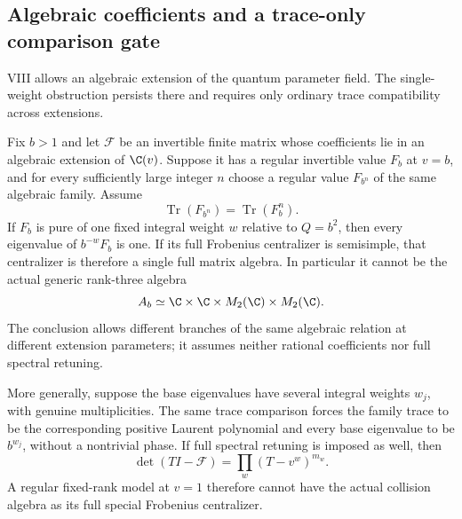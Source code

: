 \subsection{Algebraic coefficients and a trace-only comparison gate}
VIII allows an algebraic extension of the quantum parameter field.
The single-weight obstruction persists there and requires only
ordinary trace compatibility across extensions.

\begin{finding}\label{f:algebraictrace}
Fix $b>1$ and let $\mathcal F$ be an invertible finite matrix
whose coefficients lie in an algebraic extension of $\C(v)$.
Suppose it has a regular invertible value $F_b$ at $v=b$,
and for every sufficiently large integer $n$ choose a regular
value $F_{b^n}$ of the same algebraic family.
Assume
\begin{equation}\label{eq:algebraictraceretune}
 \operatorname{Tr}(F_{b^n})=\operatorname{Tr}(F_b^n).
\end{equation}
If $F_b$ is pure of one fixed integral weight $w$ relative
to $Q=b^2$, then every eigenvalue of $b^{-w}F_b$ is one.
If its full Frobenius centralizer is semisimple, that
centralizer is therefore a single full matrix algebra.
In particular it cannot be the actual generic rank-three
algebra
\[
 A_b\simeq\C\times\C\times M_2(\C)\times M_2(\C).
\]
The conclusion allows different branches of the same
algebraic relation at different extension parameters;
it assumes neither rational coefficients nor full
spectral retuning.

More generally, suppose the base eigenvalues have several
integral weights $w_j$, with genuine multiplicities.
The same trace comparison forces the family trace to be
the corresponding positive Laurent polynomial and every
base eigenvalue to be $b^{w_j}$, without a nontrivial phase.
If full spectral retuning is imposed as well, then
\[
 \det(TI-\mathcal F)=\prod_w(T-v^w)^{m_w}.
\]
A regular fixed-rank model at $v=1$ therefore cannot
have the actual collision algebra as its full special
Frobenius centralizer.
\end{finding}


